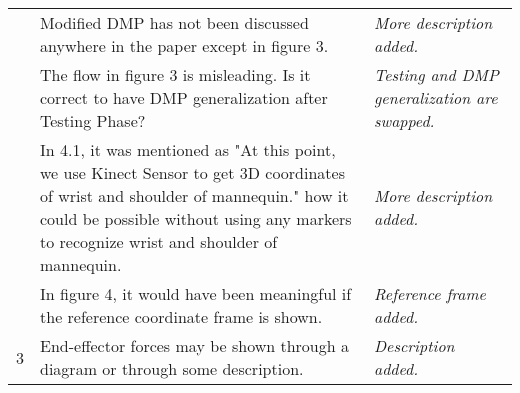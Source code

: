 \documentclass{article}
\begin{document}
\begin{table}
\begin{tabular}{ |c|p{9cm}|p{5cm}| }
		                   & Modified DMP has not been discussed anywhere in the paper except in figure 3.                                                                                                                                                                                                                                                                                                                                              & \textit{More description added.}                                                                                                            \\ \cline{2-3}
		                   & The flow in figure 3 is misleading. Is it correct to have DMP generalization after Testing Phase?                                                                                                                                                                                                                                                                                                                          & \textit{Testing and DMP generalization are swapped.}                                                                                        \\ \cline{2-3}
		                   & In 4.1, it was mentioned as "At this point, we use Kinect Sensor to get 3D coordinates of wrist and shoulder of mannequin." how it could be possible without using any markers to recognize wrist and shoulder of mannequin.                                                                                                                                                                                               & \textit{More description added.}                                                                                                            \\ \cline{2-3}
		                   & In figure 4, it would have been meaningful if the reference coordinate frame is shown.                                                                                                                                                                                                                                                                                                                                     & \textit{Reference frame added.}                                                                                                             \\ \hline
		\multirow{3}{*}{3} & End-effector forces may be shown through a diagram or through some description.                                                                                                                                                                                                                                                                                                                                            & \textit{Description added.}                                                                                                                 \\ \cline{2-3}

\end{tabular}
\end{table}
\end{document}
